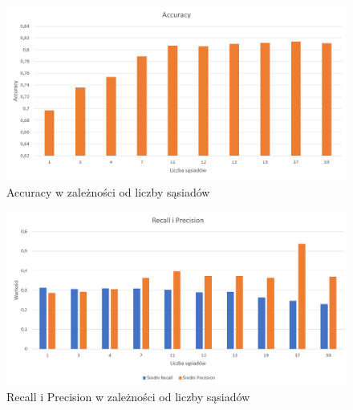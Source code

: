 \documentclass{classrep}
\begin{document}
{\begin{figure}[H]
\caption{Accuracy w zależności od liczby sąsiadów}
\centering
\includegraphics[width=1\textwidth]{i1}
\end{figure}

\begin{figure}[H]
\caption{Recall i Precision w zależności od liczby sąsiadów}
\centering
\includegraphics[width=1\textwidth]{i2}
\end{figure}

}
\end{document}
